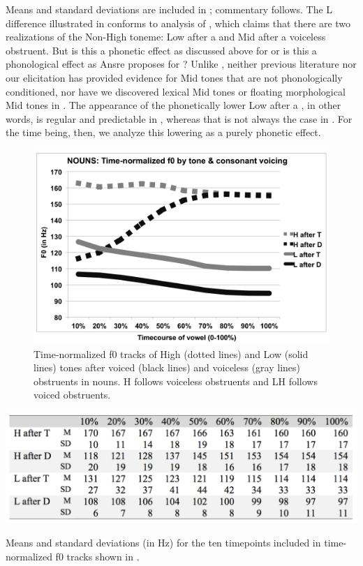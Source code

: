 \documentclass[output=paper,newtxmath,modfonts,nonflat]{langsci/langscibook}
\begin{document}
Means and standard deviations are included in ; commentary follows. The L  difference illustrated in  conforms to  analysis of , which claims that there are two realizations of the Non-High toneme: Low after a  and Mid after a voiceless obstruent. But is this a phonetic effect as discussed above for  \citep{Oglesbee2008} or is this a phonological effect as Ansre proposes for ? Unlike , neither previous  literature nor our elicitation has provided evidence for Mid tones that are not phonologically conditioned, nor have we discovered lexical Mid tones or floating morphological Mid tones in . The appearance of the phonetically lower Low after a , in other words, is regular and predictable in , whereas that is not always the case in . For the time being, then, we analyze this  lowering as a purely phonetic effect.


\begin{figure}
	\includegraphics[width=\textwidth]{figures/fig-lotven-4.png}
	\caption{\label{fig:lotven:4} Time-normalized f0 tracks of High (dotted lines) and Low (solid lines) tones after voiced (black lines) and voiceless (gray lines) obstruents in nouns. H follows voiceless obstruents and LH follows voiced obstruents.}
\end{figure}


\begin{table} 
	\includegraphics[width=\textwidth]{figures/tab-lotven-2.png}
	\caption{Means and standard deviations (in Hz) for the ten timepoints included in time-normalized f0 tracks shown in .}
	\label{tab:lotven:2}
\end{table}
\end{document}
